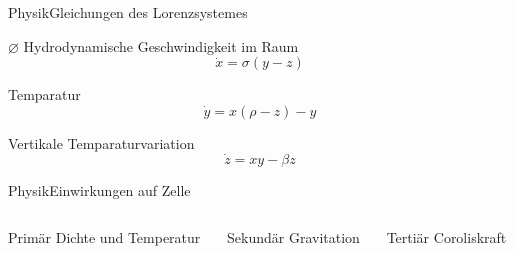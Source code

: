 \documentclass[presentation.tex]{subfiles}
\begin{document}
	\begin{frame}{Physik}{Gleichungen des Lorenzsystemes}
		\begin{block}{$\varnothing$ Hydrodynamische Geschwindigkeit im Raum}
			\begin{equation}
				\dot{x} = \sigma(y - z)
			\end{equation}
		\end{block}
		\begin{block}{Temparatur}
			\begin{equation}
				\dot{y} = x(\rho - z) - y
			\end{equation}
		\end{block}
		\begin{block}{Vertikale Temparaturvariation}
			\begin{equation}
				\dot{z} = xy - \beta z
			\end{equation}
		\end{block}
	\end{frame}

	\begin{frame}{Physik}{Einwirkungen auf Zelle}
		\begin{columns}[c]
			\begin{column}{.3\textwidth}
				\begin{block}{Primär}
					Dichte und Temperatur
				\end{block}
			\end{column}
			\begin{column}{.3\textwidth}
				\begin{block}{Sekundär}
					Gravitation
				\end{block}
			\end{column}
			\begin{column}{0.3\textwidth}
				\begin{block}{Tertiär}
					Coroliskraft
				\end{block}
			\end{column}
		\end{columns}
	\end{frame}
\end{document}

